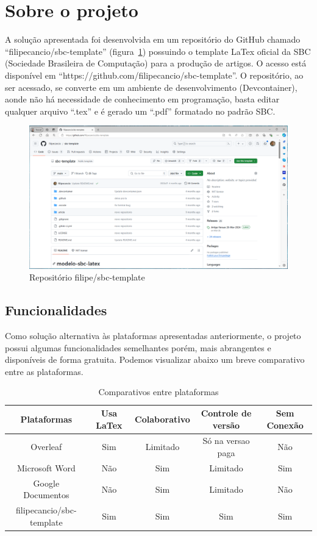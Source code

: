 \section{Sobre o projeto}

A solução apresentada foi desenvolvida em um repositório do GitHub chamado ``filipecancio/sbc-template'' (figura~\ref{fig:fig10}) possuindo o template LaTex oficial da SBC (Sociedade Brasileira de Computação) para a produção de artigos. O acesso está disponível em ``https://github.com/filipecancio/sbc-template''. O repositório, ao ser acessado, se converte em um ambiente de desenvolvimento (Devcontainer), aonde não há necessidade de conhecimento em programação, basta editar qualquer arquivo ``.tex'' e é gerado um ``.pdf'' formatado no padrão SBC.

\begin{figure}[ht]
	\centering
	\includegraphics[width=.7\textwidth]{./images/fig10.png}
	\caption{Repositório filipe/sbc-template}
	\label{fig:fig10}
\end{figure}

\subsection{Funcionalidades}

Como solução alternativa às plataformas apresentadas anteriormente, o projeto possui algumas funcionalidades semelhantes porém, mais abrangentes e disponíveis de forma gratuita. Podemos visualizar abaixo um breve comparativo entre as plataformas.

\begin{table}[ht]
	\centering
	\begin{tabular}{|c|c|c|c|c|}
		\hline
		Plataformas & Usa LaTex & Colaborativo & Controle de versão & Sem Conexão
		\\
		\hline
		Overleaf & Sim & Limitado & Só na versao paga & Não \\
		\hline
		Microsoft Word & Não & Sim & Limitado & Sim \\
		\hline
		Google Documentos & Não & Sim & Limitado & Não \\
		\hline
		filipecancio/sbc-template & Sim & Sim & Sim & Sim \\
		\hline
	\end{tabular}
	\caption{Comparativos entre plataformas}
	\label{tab:tabela01}
\end{table}


